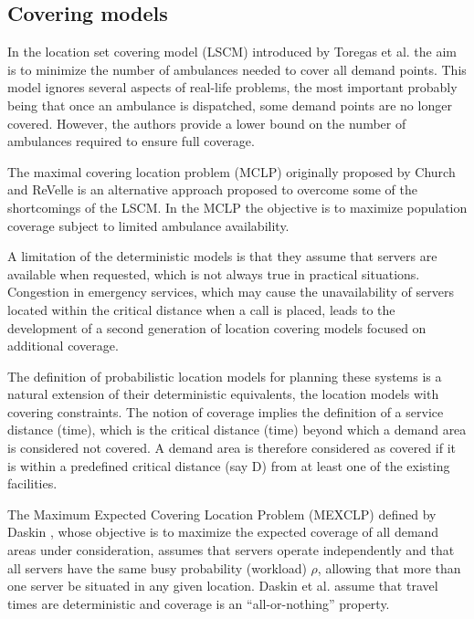 \subsection{Covering models}
In the location set covering model (LSCM)
introduced by Toregas et al. \cite{toregas1971location}
the aim
is to minimize
the number of ambulances needed
to cover all demand points.
This model
ignores several aspects of real-life problems,
the most important
probably being that
once an ambulance is dispatched,
some demand points
are no longer covered.
However,
the authors provide
a lower bound
on the number of ambulances
required to ensure full coverage.

The maximal covering location problem (MCLP)
originally proposed by Church and ReVelle \cite{church1974maximal}
is an alternative approach
proposed to overcome some of the shortcomings of the LSCM.
In the MCLP the objective is to maximize population coverage
subject to limited ambulance availability.

A limitation of the deterministic models
is that
they assume
that servers are available when requested,
which is not always true in practical situations.
Congestion in emergency services,
which may cause
the unavailability of servers located
within the critical distance
when a call is placed,
leads to
the development of
a second generation of location covering models
focused on additional coverage.

The definition of
probabilistic location models for planning these systems
is a natural extension
of their deterministic equivalents,
the location models with covering constraints.
The notion of coverage
implies
the definition of a service distance (time),
which is the critical distance (time)
beyond which a demand area is considered not covered.
A demand area is
therefore
considered as covered
if
it is within a predefined critical distance (say D)
from at least one of the existing facilities.

The Maximum Expected Covering Location Problem (MEXCLP)
defined by Daskin \cite{daskin1983maximum},
whose objective is to
maximize the expected coverage
of all demand areas under consideration,
assumes that servers operate independently
and that all servers have the same busy probability (workload) $\rho$,
allowing that more than one server be situated in any given location.
Daskin et al. \cite{daskin1981hierarchical}
assume
that travel times are deterministic
and coverage is an ``all-or-nothing'' property.

